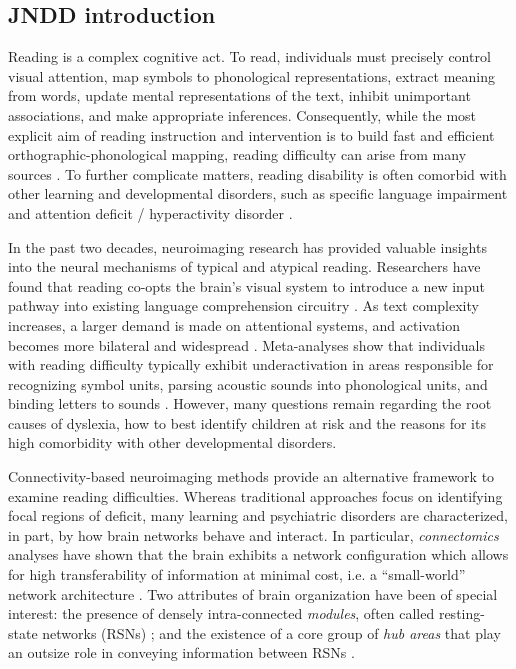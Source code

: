 \subsection{JNDD introduction}
Reading is a complex cognitive act. To read, individuals must precisely control visual attention, map symbols to phonological representations, extract meaning from words, update mental representations of the text, inhibit unimportant associations, and make appropriate inferences. Consequently, while the most explicit aim of reading instruction and intervention is to build fast and efficient orthographic-phonological mapping, reading difficulty can arise from many sources \cite{Pennington2009, vanderLely2010}. To further complicate matters, reading disability is often comorbid with other learning and developmental disorders, such as specific language impairment and attention deficit / hyperactivity disorder \cite{Pennington2006, Margari2013}.

In the past two decades, neuroimaging research has provided valuable insights into the neural mechanisms of typical and atypical reading. Researchers have found that reading co-opts the brain's visual system to introduce a new input pathway into existing language comprehension circuitry \cite{Jobard2007}. As text complexity increases, a larger demand is made on attentional systems, and activation becomes more bilateral and widespread \cite{Xu2005}.  Meta-analyses show that individuals with reading difficulty typically exhibit underactivation in areas responsible for recognizing symbol units, parsing acoustic sounds into phonological units, and binding letters to sounds \cite{Maisog2008, Richlan2009, Paulesu2014}. However, many questions remain regarding the root causes of dyslexia, how to best identify children at risk and the reasons for its high comorbidity with other developmental disorders. 

Connectivity-based neuroimaging methods provide an alternative framework to examine reading difficulties. Whereas traditional  approaches focus on identifying focal regions of deficit, many learning and psychiatric disorders are characterized, in part, by how brain networks behave and interact. In particular, \textit{connectomics} analyses have shown that the brain exhibits a network configuration which allows for high transferability of information at minimal cost, i.e. a “small-world” network architecture \cite{Bullmore2012}. Two attributes of brain organization have been of special interest: the presence of densely intra-connected \textit{modules}, often called resting-state networks (RSNs) \cite{Sporns2016}; and the existence of a core group of \textit{hub areas} that play an outsize role in conveying information between RSNs \cite{VandenHeuvel2011}. 

